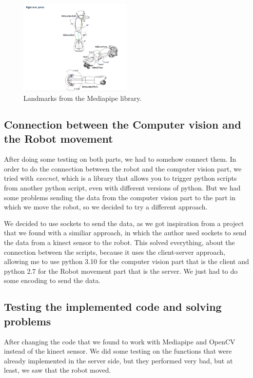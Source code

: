 \documentclass[conference]{IEEEtran}
\begin{document}
\begin{figure}[htbp]
    \centerline{\includegraphics[width=0.5\textwidth]{images/RightArmAngles.jpeg}}
    \caption{Landmarks from the Mediapipe library.}
    \label{fig:RightArmAngles}
    \end{figure}

\subsection{Connection between the Computer vision and the Robot movement}
After doing some testing on both parts, we had to somehow connect them. In order to do the connection between the robot and the computer vision part, we tried with \textit{execnet}, which is a library that allows you to trigger python scripts from another python script, even with different versions of python. But we had some problems sending the data from the computer vision part to the part in which we move the robot, so we decided to try a different approach.

We decided to use sockets to send the data, as we got inspiration from a project that we found with a similiar approach, in which the author used sockets to send the data from a kinect sensor to the robot.
This solved everything, about the connection between the scripts, because it uses the client-server approach, allowing me to use python 3.10 for the computer vision part that is the client and python 2.7 for the Robot movement part that is the server. We just had to do some encoding to send the data. 

\subsection{Testing the implemented code and solving problems}
After changing the code that we found to work with Mediapipe and OpenCV instead of the kinect sensor. We did some testing on the functions that were already implemented in the server side, but they performed very bad, but at least, we saw that the robot moved.
\end{document}
